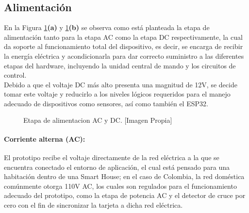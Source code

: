 	\subsection{Alimentación}
	
	En la Figura \ref{fig:balidc}\textbf{(a)} y \ref{fig:balidc}\textbf{(b)} se observa como está planteada la etapa de alimentación tanto para la etapa AC como la etapa DC respectivamente, la cual da soporte al funcionamiento total del dispositivo, es decir, se encarga de recibir la energía eléctrica y acondicionarla para dar correcto suministro a las diferentes etapas del hardware, incluyendo la unidad central de mando y los circuitos de control.\\
	
	Debido a que el voltaje DC más alto presenta una magnitud de 12V, se decide tomar este voltaje y reducirlo a los niveles lógicos requeridos para el manejo adecuado de dispositivos como sensores, así como también el ESP32. \\
	
	\begin{figure}[H]
		\centering
		\caption[Etapa de alimentacion AC y DC.]{Etapa de alimentacion AC y DC. [Imagen Propia]}
		\label{fig:balidc}
	\end{figure}
	
	
	\paragraph{Corriente alterna (AC):}
		El prototipo recibe el voltaje directamente de la red eléctrica a la que se encuentra conectado el entorno de aplicación, el cual está pensado para una habitación dentro de una Smart House; en el caso de Colombia, la red doméstica comúnmente otorga 110V AC, los cuales son regulados para el funcionamiento adecuado del prototipo, como la etapa de potencia AC y el detector de cruce por cero con el fin de sincronizar la tarjeta a dicha red eléctrica.\\
		
